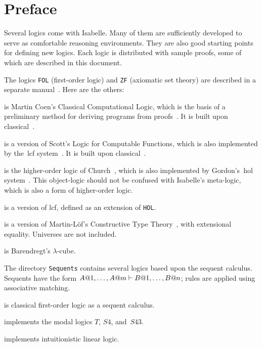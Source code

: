 \chapter*{Preface}
Several logics come with Isabelle.  Many of them are sufficiently developed
to serve as comfortable reasoning environments.  They are also good
starting points for defining new logics.  Each logic is distributed with
sample proofs, some of which are described in this document.

The logics \texttt{FOL} (first-order logic) and \texttt{ZF} (axiomatic set
theory) are described in a separate manual~\cite{isabelle-ZF}.  Here are the
others:

\begin{ttdescription}
\item[\thydx{CCL}] is Martin Coen's Classical Computational Logic,
  which is the basis of a preliminary method for deriving programs from
  proofs~\cite{coen92}.  It is built upon classical~\FOL{}.
 
\item[\thydx{LCF}] is a version of Scott's Logic for Computable
  Functions, which is also implemented by the~{\sc lcf}
  system~\cite{paulson87}.  It is built upon classical~\FOL{}.

\item[\thydx{HOL}] is the higher-order logic of Church~\cite{church40},
which is also implemented by Gordon's~{\sc hol} system~\cite{mgordon-hol}.
This object-logic should not be confused with Isabelle's meta-logic, which is
also a form of higher-order logic.

\item[\thydx{HOLCF}] is a version of {\sc lcf}, defined as an
  extension of \texttt{HOL}\@.
 
\item[\thydx{CTT}] is a version of Martin-L\"of's Constructive Type
Theory~\cite{nordstrom90}, with extensional equality.  Universes are not
included.

\item[\thydx{Cube}] is Barendregt's $\lambda$-cube.
 \end{ttdescription}

The directory \texttt{Sequents} contains several logics based
  upon the sequent calculus.  Sequents have the form $A@1,\ldots,A@m\vdash
B@1,\ldots,B@n$; rules are applied using associative matching.
\begin{ttdescription}
\item[\thydx{LK}] is classical first-order logic as a sequent calculus.

\item[\thydx{Modal}] implements the modal logics $T$, $S4$, and~$S43$.  

\item[\thydx{ILL}] implements intuitionistic linear logic.
\end{ttdescription}

